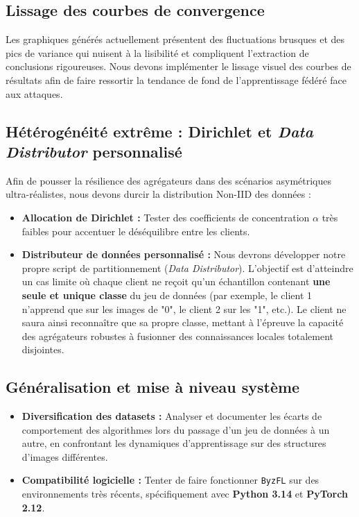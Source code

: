 \documentclass[11pt, a4paper]{article}
\begin{document}
\subsection{Lissage des courbes de convergence}
Les graphiques générés actuellement présentent des fluctuations brusques et des pics de variance qui nuisent à la lisibilité et compliquent l'extraction de conclusions rigoureuses. Nous devons implémenter le lissage visuel des courbes de résultats afin de faire ressortir la tendance de fond de l'apprentissage fédéré face aux attaques.

\subsection{Hétérogénéité extrême : Dirichlet et \textit{Data Distributor} personnalisé}
Afin de pousser la résilience des agrégateurs dans des scénarios asymétriques ultra-réalistes, nous devons durcir la distribution Non-IID des données :
\begin{itemize}
    \item \textbf{Allocation de Dirichlet :} Tester des coefficients de concentration $\alpha$ très faibles pour accentuer le déséquilibre entre les clients.
    \item \textbf{Distributeur de données personnalisé :} Nous devrons développer notre propre script de partitionnement (\textit{Data Distributor}). L'objectif est d'atteindre un cas limite où chaque client ne reçoit qu'un échantillon contenant \textbf{une seule et unique classe} du jeu de données (par exemple, le client 1 n'apprend que sur les images de "0", le client 2 sur les "1", etc.). Le client ne saura ainsi reconnaître que sa propre classe, mettant à l'épreuve la capacité des agrégateurs robustes à fusionner des connaissances locales totalement disjointes.
\end{itemize}

\subsection{Généralisation et mise à niveau système}
\begin{itemize}
    \item \textbf{Diversification des datasets :} Analyser et documenter les écarts de comportement des algorithmes lors du passage d'un jeu de données à un autre, en confrontant les dynamiques d'apprentissage sur des structures d'images différentes.
    \item \textbf{Compatibilité logicielle :} Tenter de faire fonctionner \texttt{ByzFL} sur des environnements très récents, spécifiquement avec \textbf{Python 3.14} et \textbf{PyTorch 2.12}.
\end{itemize}
\end{document}
